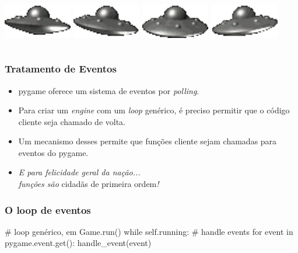 \begin{frame}
\begin{columns}
        \begin{column}{0.3\textwidth}
            \includegraphics[width=3cm]{images/out0002.png}
            \vfill
            \includegraphics[width=3cm]{images/out0005.png}
            \vfill
            \includegraphics[width=3cm]{images/out0008.png}
            \vfill
            \includegraphics[width=3cm]{images/out0011.png}
        \end{column}
    \end{columns}
\end{frame}

\begin{frame}
    \frametitle{Tratamento de Eventos}

    \begin{itemize}
        \item pygame oferece um sistema de eventos por \textit{polling}.
        \item Para criar um \textit{engine} com um \textit{loop} genérico,
        é preciso permitir que o código cliente seja chamado de volta.
        \item Um mecanismo desses permite que funções cliente sejam chamadas
        para eventos do pygame.
        \item \textit{E para felicidade geral da nação...\\ funções são} cidadãs de primeira ordem\textit{!}
    \end{itemize}
\end{frame}

\begin{frame}[fragile]
    \frametitle{O loop de eventos}

    \begin{python}
# loop genérico, em Game.run()
while self.running:
    # handle events
    for event in pygame.event.get():
        handle_event(event)
    \end{python}
\end{frame}

